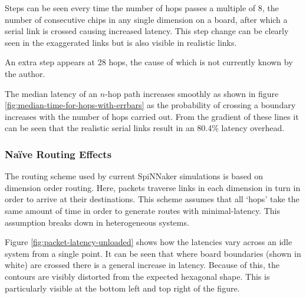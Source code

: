				Steps can be seen every time the number of hops passes a multiple of 8,
				the number of consecutive chips in any single dimension on a board, after
				which a serial link is crossed causing increased latency. This step
				change can be clearly seen in the exaggerated links but is also visible in
				realistic links.
				
				An extra step appears at 28 hops, the cause of which is not currently
				known by the author.
				
				
				The median latency of an $n$-hop path increases smoothly as shown in
				figure \ref{fig:median-time-for-hops-with-errbars} as the probability of
				crossing a boundary increases with the number of hops carried out. From
				the gradient of these lines it can be seen that the realistic serial links
				result in an 80.4\% latency overhead.
			
			\subsubsection{Na\"ive Routing Effects}
				
				The routing scheme used by current SpiNNaker simulations is based on
				dimension order routing. Here, packets traverse links in each dimension
				in turn in order to arrive at their destinations.  This scheme assumes
				that all `hops' take the same amount of time in order to generate routes
				with minimal-latency. This assumption breaks down in heterogeneous
				systems.
				
				Figure \ref{fig:packet-latency-unloaded} shows how the latencies vary
				across an idle system from a single point. It can be seen that where board
				boundaries (shown in white) are crossed there is a general increase in
				latency. Because of this, the contours are visibly distorted from the
				expected hexagonal shape. This is particularly visible at the bottom left
				and top right of the figure.
				
